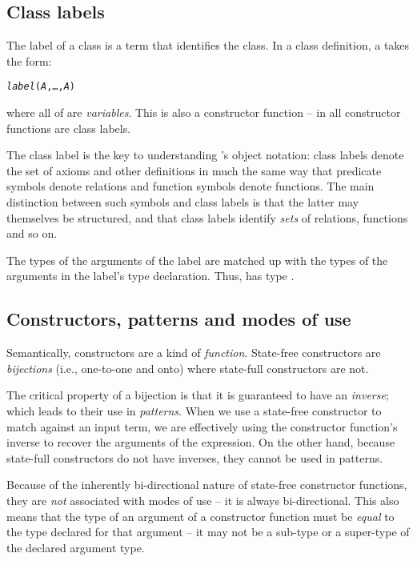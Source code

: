 \subsection{Class labels}
\label{object:class label}
The label of a class is a term that identifies the class. In a class definition, a  takes the form:
\begin{alltt}
\emph{label}(\emph{A},\ldots,\emph{A\subn})
\end{alltt}
where all of  are \emph{variables}. This is also a constructor function -- in \go all constructor functions are class labels.

The class label is the key to understanding \go's object notation: class labels denote the set of axioms and other definitions in much the same way that predicate symbols denote relations and function symbols denote functions. The main distinction between such symbols and class labels is that the latter may themselves be structured, and that class labels identify \emph{sets} of relations, functions and so on.

The types of the arguments of the label are matched up with the types of the arguments in the label's type declaration. Thus, \emph{} has type . 

\subsection{Constructors, patterns and modes of use}
Semantically, constructors are a kind of \emph{function}. State-free constructors are \emph{bijections} (i.e., one-to-one and onto) where state-full constructors are not.

The critical property of a bijection is that it is guaranteed to have an \emph{inverse}; which leads to their use in \emph{patterns}. When we use a state-free constructor to match against an input term, we are effectively using the constructor function's inverse to recover the arguments of the expression. On the other hand, because state-full constructors do not have inverses, they cannot be used in patterns.

Because of the inherently bi-directional nature of state-free constructor functions, they are \emph{not} associated with modes of use -- it is always bi-directional. This also means that the type of an argument of a constructor function must be \emph{equal} to the type declared for that argument -- it may not be a sub-type or a super-type of the declared argument type.

